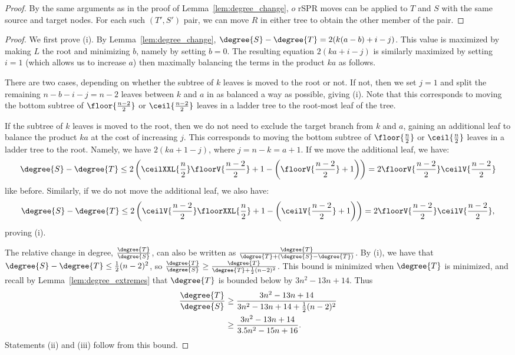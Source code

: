 \documentclass[11pt]{amsart}
\begin{document}
\pairedneighbors*
\begin{proof}
By the same arguments as in the proof of Lemma~\ref{lem:degree_change}, $o$ rSPR moves can be applied to $T$ and $S$ with the same source and target nodes.
For each such $(T',S')$ pair, we can move $R$ in either tree to obtain the other member of the pair.
\end{proof}

\degreemaxdeltaadjacent*
\begin{proof}
	We first prove (i).
	By Lemma~\ref{lem:degree_change}, $\degree{S} - \degree{T} = 2(k(a-b) + i - j)$.
	This value is maximized by making $L$ the root and minimizing $b$, namely by setting $b=0$.
	The resulting equation $2(ka + i - j)$ is similarly maximized by setting $i=1$ (which allows us to increase $a$) then maximally balancing the terms in the product $ka$ as follows.

	There are two cases, depending on whether the subtree of $k$ leaves is moved to the root or not.
    If not, then we set $j=1$ and split the remaining $n-b-i-j = n-2$ leaves between $k$ and $a$ in as balanced a way as possible, giving (i).
	Note that this corresponds to moving the bottom subtree of $\floor{\frac{n-2}{2}}$ or $\ceil{\frac{n-2}{2}}$ leaves in a ladder tree to the root-most leaf of the tree.

	If the subtree of $k$ leaves is moved to the root, then we do not need to exclude the target branch from $k$ and $a$, gaining an additional leaf to balance the product $ka$ at the cost of increasing $j$.
	This corresponds to moving the bottom subtree of $\floor{\frac{n}{2}}$ or $\ceil{\frac{n}{2}}$ leaves in a ladder tree to the root.
	Namely, we have $2(ka + 1 - j)$, where $j = n - k = a + 1$.
	If we move the additional leaf, we have:
$$\degree{S} - \degree{T} \le 2\left(\ceilXXL{\frac{n}{2}}\floorV{\frac{n-2}{2}}  + 1 - \left(\floorV{\frac{n-2}{2}} + 1\right)\right) = 2\floorV{\frac{n-2}{2}}\ceilV{\frac{n-2}{2}}$$
like before.
Similarly, if we do not move the additional leaf, we also have:
$$\degree{S} - \degree{T} \le 2 \left(\ceilV{\frac{n-2}{2}}\floorXXL{\frac{n}{2}} +1 -  \left(\ceilV{\frac{n-2}{2}} + 1\right)\right) = 2\floorV{\frac{n-2}{2}}\ceilV{\frac{n-2}{2}},$$
proving (i).

The relative change in degree, $\frac{\degree{T}}{\degree{S}}$, can also be written as $\frac{\degree{T}}{\degree{T} + (\degree{S} - \degree{T})}$.
By (i), we have that $\degree{S} - \degree{T} \le \frac{1}{2} (n-2)^2$,
so $\frac{\degree{T}}{\degree{S}} \ge \frac{\degree{T}}{\degree{T} + \frac{1}{2} (n-2)^2} $.
This bound is minimized when $\degree{T}$ is minimized, and recall by Lemma~\ref{lem:degree_extremes} that $\degree{T}$ is bounded below by $3n^2 - 13n + 14$.
	Thus
	\begin{align*}
		\frac{\degree{T}}{\degree{S}} &\ge \frac{3n^2 - 13n + 14}{3n^2 - 13n + 14 + \frac{1}{2}(n-2)^2} \\
		&\ge \frac{3n^2 - 13n + 14}{3.5n^2 - 15n + 16}.
	\end{align*}
	Statements (ii) and (iii) follow from this bound.

\end{proof}
\end{document}
